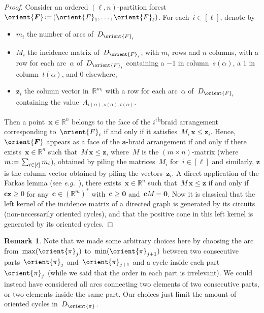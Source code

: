 \documentclass{amsart}
\theoremstyle{definition}
\newtheorem{remark}[theorem]{Remark}
\newcommand{\R}{\mathbb{R}} %
\renewcommand{\b}[1]{{\boldsymbol{#1}}} %
\newcommand{\eqdef}{\mbox{\,\raisebox{0.2ex}{\scriptsize\ensuremath{\mathrm:}}\ensuremath{=}\,}} %
\newcommand{\eg}{\textit{e.g.}~} %
\newcommand{\ordinal}{\textsuperscript{th}} %
\renewcommand{\b}[1]{\boldsymbol{#1}} %
\begin{document}
\begin{proof}
Consider an ordered $(\ell,n)$-partition forest~$\orient{\b{F}} \eqdef (\orient{F}_1, \dots, \orient{F}_\ell)$.
For each~$i \in [\ell]$, denote by
\begin{itemize}
\item $m_i$ the number of arcs of~$D_{\orient{F}_i}$
\item $M_i$ the incidence matrix of~$D_{\orient{F}_i}$, with $m_i$ rows and $n$ columns, with a row for each arc~$\alpha$ of~$D_{\orient{F}_i}$ containing a $-1$ in column~$s(\alpha)$, a $1$ in column~$t(\alpha)$, and $0$ elsewhere,
\item $\b{z}_i$ the column vector in~$\R^{m_i}$ with a row for each arc~$\alpha$ of~$D_{\orient{F}_i}$ containing the value~$A_{i(\alpha), s(\alpha), t(\alpha)}$.
\end{itemize}
Then a point~$\b{x} \in \R^n$ belongs to the face of the $i$\ordinal braid arrangement corresponding to~$\orient{F}_i$ if and only if it satisfies~$M_i \, \b{x} \le \b{z}_i$.
Hence, $\orient{\b{F}}$ appears as a face of the $\b{a}$-braid arrangement if and only if there exists~$\b{x} \in \R^n$ such that~$M \, \b{x} \le \b{z}$, where~$M$ is the $(m \times n)$-matrix (where~$m \eqdef \sum_{i \in [\ell]} m_i$), obtained by piling the matrices~$M_i$ for~$i \in [\ell]$ and similarly, $\b{z}$ is the column vector obtained by piling the vectors~$\b{z}_i$.
A direct application of the Farkas lemma (see \eg \cite[Prop.~1.7]{Ziegler-polytopes}), there exists~$\b{x} \in \R^n$ such that~$M \, \b{x} \le \b{z}$ if and only if~$\b{c} \b{z} \ge 0$ for any~$\b{c} \in (\R^m)^*$ with~$\b{c} \ge \b{0}$ and~$\b{c} M = \b{0}$.
Now it is classical that the left kernel of the incidence matrix of a directed graph is generated by its circuits (non-necessarily oriented cycles), and that the positive cone in this left kernel is generated by its oriented cycles.
\end{proof}

\begin{remark}
Note that we made some arbitrary choices here by choosing the arc from~$\max(\orient{\pi}_j)$ to~$\min(\orient{\pi}_{j+1})$ between two consecutive parts~$\orient{\pi}_j$ and~$\orient{\pi}_{j+1}$ and a cycle inside each part~$\orient{\pi}_j$ (while we said that the order in each part is irrelevant).
We could instead have considered all arcs connecting two elements of two consecutive parts, or two elements inside the same part.
Our choices just limit the amount of oriented cycles in~$D_{\orient{\pi}}$.
\end{remark}
\end{document}
